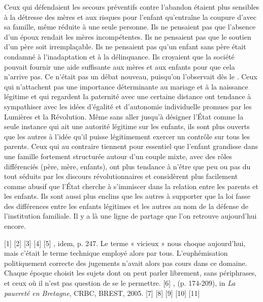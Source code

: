  Ceux qui défendaient les secours préventifs contre l'abandon étaient plus sensibles à la détresse des mères et aux risques pour l'enfant qu'entraîne la coupure d'avec sa famille, même réduite à une seule personne. Ils ne pensaient pas que l'absence d'un époux rendait les mères incompétentes. Ils ne pensaient pas que le soutien d'un père soit irremplaçable. Ils ne pensaient pas qu'un enfant sans père était condamné à l'inadaptation et à la délinquance. Ils croyaient que la société pouvait fournir une aide suffisante aux mères et aux enfants pour que cela n'arrive pas. Ce n'était pas un débat nouveau, puisqu'on l'observait dès le . Ceux qui n'attachent pas une importance déterminante au mariage et à la naissance légitime et qui regardent la paternité avec une certaine distance ont tendance à sympathiser avec les idées d'égalité et d'autonomie individuelle promues par les Lumières et la Révolution. Même sans aller jusqu'à désigner l'État comme la seule instance qui ait une autorité légitime sur les enfants, ils sont plus ouverts que les autres à l'idée qu'il puisse légitimement exercer un contrôle sur tous les parents. Ceux qui au contraire tiennent pour essentiel que l'enfant grandisse dans une famille fortement structurée autour d'un couple mixte, avec des rôles différenciés (père, mère, enfants), ont plus tendance à n'être que peu ou pas du tout séduits par les discours révolutionnaires et considèrent plus facilement comme abusif que l'État cherche à s'immiscer dans la relation entre les parents et les enfants. Ils sont aussi plus enclins que les autres à supporter que la loi fasse des différences entre les enfants légitimes et les autres au nom de la défense de l'institution familiale. Il y a là une ligne de partage que l'on retrouve aujourd'hui encore.
 
[1] 
[2] 
[3] 
[4] 
[5] , idem, p. 247. Le terme « vicieux » nous choque aujourd'hui, mais c'était le terme technique employé alors par tous. L'euphémisation politiquement correcte des jugements n'avait alors pas cours dans ce domaine. Chaque époque choisit les sujets dont on peut parler librement, sans périphrases, et ceux où il n'est pas question de se le permettre.
[6] ,  (p. 174-209), in \emph{La pauvreté en Bretagne}, CRBC, BREST, 2005.
[7] 
[8] 
[9]  
[10] 
[11] 